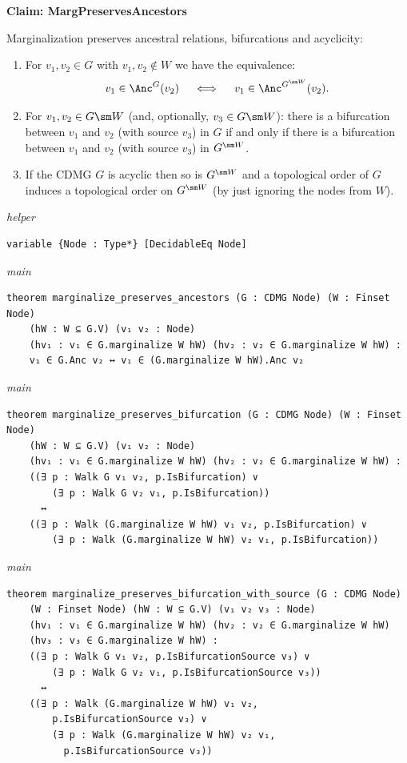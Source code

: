 \noindent\textbf{Claim: MargPreservesAncestors}\par\smallskip
{\appendixTexSize
\label{rem:marg_preserves_ancestors_bifurcations_acyclicity}
Marginalization preserves ancestral relations, bifurcations and acyclicity:
    \begin{enumerate}
        \item For $v_1,v_2 \in G$ with $v_1,v_2 \notin W$ we have the equivalence:
            \[ v_1 \in \Anc^G(v_2)\quad \iff \quad v_1 \in \Anc^{G^{\sm W}}(v_2).   \]
          \item\label{rem:marg_preserves_bifurcations} 
            For $v_1,v_2 \in G \sm W$ (and, optionally, $v_3 \in G\sm W$): there is a bifurcation between $v_1$ and $v_2$ (with source $v_3$) in $G$ if and only if there is a bifurcation between $v_1$ and $v_2$ (with source $v_3$) in $G^{\sm W}$.
        \item If the CDMG $G$ is acyclic then so is $G^{\sm W}$ and a topological order of $G$ induces a
            topological order on $G^{\sm W}$ (by just ignoring the nodes from $W$).
    \end{enumerate}
\par}
\smallskip
{\small\textit{helper}}
\begin{verbatim}
variable {Node : Type*} [DecidableEq Node]
\end{verbatim}
{\small\textit{main}}
\begin{verbatim}
theorem marginalize_preserves_ancestors (G : CDMG Node) (W : Finset Node)
    (hW : W ⊆ G.V) (v₁ v₂ : Node)
    (hv₁ : v₁ ∈ G.marginalize W hW) (hv₂ : v₂ ∈ G.marginalize W hW) :
    v₁ ∈ G.Anc v₂ ↔ v₁ ∈ (G.marginalize W hW).Anc v₂
\end{verbatim}
{\small\textit{main}}
\begin{verbatim}
theorem marginalize_preserves_bifurcation (G : CDMG Node) (W : Finset Node)
    (hW : W ⊆ G.V) (v₁ v₂ : Node)
    (hv₁ : v₁ ∈ G.marginalize W hW) (hv₂ : v₂ ∈ G.marginalize W hW) :
    ((∃ p : Walk G v₁ v₂, p.IsBifurcation) ∨
        (∃ p : Walk G v₂ v₁, p.IsBifurcation))
      ↔
    ((∃ p : Walk (G.marginalize W hW) v₁ v₂, p.IsBifurcation) ∨
        (∃ p : Walk (G.marginalize W hW) v₂ v₁, p.IsBifurcation))
\end{verbatim}
{\small\textit{main}}
\begin{verbatim}
theorem marginalize_preserves_bifurcation_with_source (G : CDMG Node)
    (W : Finset Node) (hW : W ⊆ G.V) (v₁ v₂ v₃ : Node)
    (hv₁ : v₁ ∈ G.marginalize W hW) (hv₂ : v₂ ∈ G.marginalize W hW)
    (hv₃ : v₃ ∈ G.marginalize W hW) :
    ((∃ p : Walk G v₁ v₂, p.IsBifurcationSource v₃) ∨
        (∃ p : Walk G v₂ v₁, p.IsBifurcationSource v₃))
      ↔
    ((∃ p : Walk (G.marginalize W hW) v₁ v₂,
        p.IsBifurcationSource v₃) ∨
        (∃ p : Walk (G.marginalize W hW) v₂ v₁,
          p.IsBifurcationSource v₃))
\end{verbatim}
